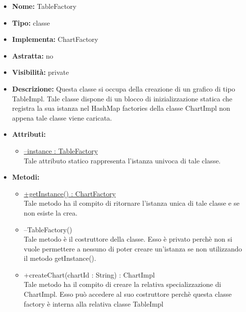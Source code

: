 			
			\begin{itemize}
			\item \textbf{Nome:} TableFactory
			\item \textbf{Tipo:} classe
			
		\item \textbf{Implementa:}
		ChartFactory
		\item \textbf{Astratta:}
		no
			\item \textbf{Visibilità:} private
			\item \textbf{Descrizione:} Questa classe si occupa della creazione di un grafico di tipo TableImpl. Tale classe dispone di un blocco di inizializzazione statica che registra la sua istanza nel HashMap factories della classe ChartImpl non appena tale classe viene caricata.
			\item \textbf{Attributi:}
				\begin{itemize}
				\setlength{\itemsep}{5pt}
				
					\item[\ding{111}] \underline{--instance : TableFactory} \\ [1mm] Tale attributo statico rappresenta l'istanza univoca di tale classe.
				\end{itemize}
		
			\item \textbf{Metodi:}
				\begin{itemize}
				\setlength{\itemsep}{5pt}
				
					\item[\ding{111}] {\underline{+getInstance() : ChartFactory}} \\ [1mm] Tale metodo ha il compito di ritornare l'istanza unica di tale classe e se non esiste la crea.
					\item[\ding{111}] {{--TableFactory()}} \\ [1mm] Tale metodo è il costruttore della classe. Esso è privato perchè non si vuole permettere a nessuno di poter creare un'istanza se non utilizzando il metodo getInstance().
					\item[\ding{111}] {{+createChart(chartId : String) : ChartImpl}} \\ [1mm] Tale metodo ha il compito di creare la relativa specializzazione di ChartImpl. Esso può accedere al suo costruttore perchè questa classe factory è interna alla relativa classe TableImpl
				\end{itemize}
		
			\end{itemize}

